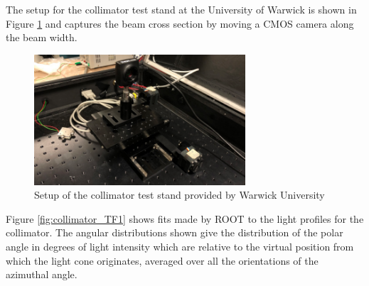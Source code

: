 The setup for the collimator test stand at the University of Warwick is shown in Figure \ref{fig:coll_test_stand} and captures the beam cross section by moving a CMOS camera along the beam width. 

\begin{figure}
    \centering
    \includegraphics[width=0.7\textwidth]{Figures/coll_test_stand.png}
    \caption{Setup of the collimator test stand provided by Warwick University}
    \label{fig:coll_test_stand}
\end{figure}

Figure \ref{fig:collimator_TF1} shows fits made by ROOT to the light profiles for the collimator. The angular distributions shown give the distribution of the polar angle in degrees of light intensity which are relative to the virtual position from which the light cone originates, averaged over all the orientations of the azimuthal angle. 

